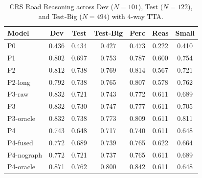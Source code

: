 \begin{table}[t]
\centering
\caption{CRS Road Reasoning across Dev ($N=101$), Test ($N=122$), and Test-Big ($N=494$) with 4-way TTA.}
\begin{tabular}{lcccccc}
\toprule
Model & Dev & Test & Test-Big & Perc & Reas & Small \\
\midrule
P0 & 0.436 & 0.434 & 0.427 & 0.473 & 0.222 & 0.410 \\
P1 & 0.802 & 0.697 & 0.753 & 0.787 & 0.600 & 0.754 \\
P2 & 0.812 & 0.738 & 0.769 & 0.814 & 0.567 & 0.721 \\
P2-long & 0.792 & 0.738 & 0.765 & 0.807 & 0.578 & 0.762 \\
P3-raw & 0.832 & 0.721 & 0.743 & 0.772 & 0.611 & 0.689 \\
P3 & 0.832 & 0.730 & 0.747 & 0.777 & 0.611 & 0.705 \\
P3-oracle & 0.832 & 0.738 & 0.773 & 0.809 & 0.611 & 0.811 \\
P4 & 0.743 & 0.648 & 0.717 & 0.740 & 0.611 & 0.648 \\
P4-fused & 0.772 & 0.689 & 0.739 & 0.765 & 0.622 & 0.664 \\
P4-nograph & 0.772 & 0.721 & 0.737 & 0.765 & 0.611 & 0.689 \\
P4-oracle & 0.871 & 0.762 & 0.800 & 0.842 & 0.611 & 0.648 \\
\bottomrule
\end{tabular}
\end{table}
